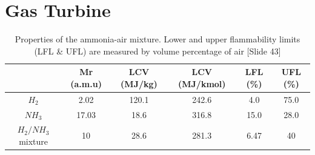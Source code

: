 

%
\section{Gas Turbine}

\begin{table} [h]
\begin{center}
\caption{Properties of the ammonia-air mixture. Lower and upper flammability limits (LFL \& UFL) are measured by volume percentage of air [Slide 43]} \label{tab:mixproperties}
\begin{tabular}{ |c|c|c|c|c|c| }
 \hline
& Mr (a.m.u) & LCV (MJ/kg) \cite{website:spg}& LCV (MJ/kmol) & LFL (\%)& UFL (\%) \\ 
 \hline
  $H_2$ & 2.02 & 120.1 & 242.6 & 4.0 & 75.0\\ 
 \hline
$NH_3$ & 17.03 & 18.6 & 316.8 & 15.0 & 28.0\\ 
 \hline
$H_2/NH_3$ mixture & 10 & 28.6 & 281.3 & 6.47 & 40\\
 \hline
\end{tabular}
\end{center} 
\end{table}


